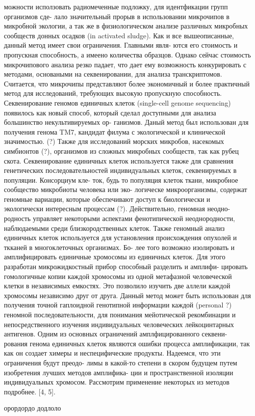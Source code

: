 можности исползовать радиомеченные подложку, для идентфикации групп организмов сде-
лало значительный прорыв в использовании микрочипов в микробной экологии, а так же
в физиологическом анализе различных микробных сообществ донных осадков (in activated
sludge). Как и все вышеописанные, данный метод имеет свои ограничения. Главными явля-
ются его стоимость и пропускная способность, а имеено количества образцов. Однако сейчас
стоимость микрочипового анализа резко падает, что дает ему возможность конкурировать
с методами, основаными на секвенировании, для анализа транскриптомов. Считается, что
микрочипы представляют более экономичный и более практичный метод для исследований,
требующих высокую пропускную способность.
Секвенирование геномов единичных клеток (single-cell genome sequencing) появилось как
новый способ, который сделал доступными для анализа большинство некультивируемых ор-
ганизмов. Даный метод был использован для получения генома TM7, кандидат филума с
экологической и клинической значимостью. (?) Также для исследований морских микробов,
насекомых симбионтов (?), организмов из сложных микробных сообществ, так как рубец
скота. Секвенирование единичных клеток используется также для сравнения генетических
последовательностей индивидуальных клеток, секвенируемых в популяции. Консорциум кле-
ток, будь то популяция клеток ткани, микробное сообщество микробиоты человека или эко-
логическе микроорганизмы, содержат геномные вариации, которые обеспечивают доступ к
биологически и экологически интересным процессам (?). Действительно, геномная неодно-
родность управляет некоторыми аспектами фенотипической неоднородности, наблюдаемыми
среди близкородственных клеток. Также геномный анализ единичных клеток используется
для установления происхождения опухолей и ткканей в многоклеточных организмах. Бо-
лее того возможно изолировать и амплифицировать единичные хромосомы из единичных
клеток. Для этого разработан микрожидкостный прибор способный разделить и амплифи-
цировать гомологичные копии каждой хромосомы из одной метафазной человеческой клетки
в независимых емкостях. Это позволило изучить две аллели каждой хромосомы независимо
друг от друга. Данный метод может быть использован для получения точной гаплоидной
генотипной информации каждой (personal ?) геномной последовательности, для понимания
мейотической рекомбинации и непосредственного изучения индивидуальных человеческих
лейкоцинтарных антигенов. Одним из основных ограничений амплфицированного секвени-
рования генома единичных клеток являются ошибки процесса амплификации, так как он
создает химеры и неспецифические продукты. Надеемся, что эти ограничения будут преодо-
лимы в какой-то степени в скором будущем путем изобретения лучших методов амплифика-
ции и пространственной изоляции индивидуальных хромосом.
Рассмотрим применение некоторых из методов подробнее. [4, 5].


орордордо
додлоло
